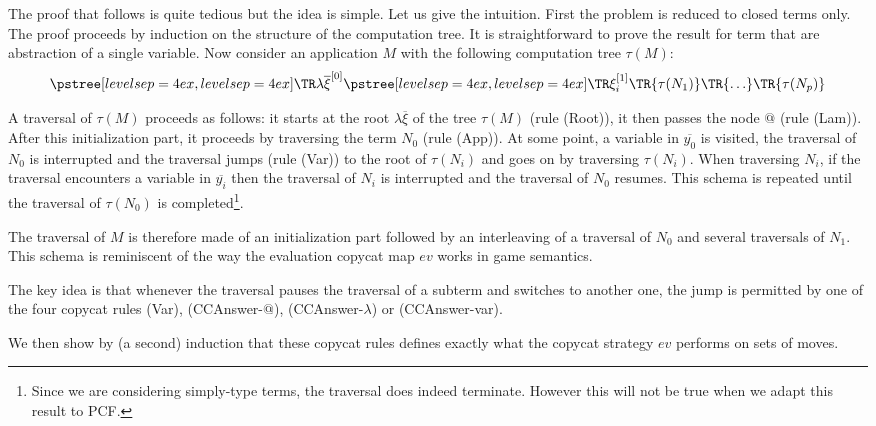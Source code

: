\begin{rem} The proof that follows is quite tedious but the idea is simple. Let us give the intuition.
    First the problem is reduced to closed terms only. The proof proceeds by induction on the structure of the computation tree.
    It is straightforward to prove the result for term that are abstraction of a single variable.
    Now consider an application $M$ with the following computation tree $\tau(M)$:
    $$ \tree[levelsep=4ex]{\lambda \overline{\xi}^{[0]}}
        { \tree[levelsep=4ex]{\xi_i^{[1]}}
            {   \TR{\tau(N_1)} \TR{\ldots} \TR{\tau(N_p)}}}
    $$

    A traversal of $\tau(M)$ proceeds as follows: it starts at the root $\lambda \overline{\xi}$ of the tree $\tau(M)$ (rule
    (Root)), it then passes the node $@$ (rule (Lam)).
    After this initialization part, it proceeds by traversing the term $N_0$ (rule (App)).
    At some point, a variable in $\overline{y_0}$ is visited, the traversal
    of $N_0$ is interrupted and the traversal jumps (rule (Var)) to the root of $\tau(N_i)$ and goes on by traversing $\tau(N_i)$.
    When traversing $N_i$, if the traversal encounters a variable in $\overline{y_i}$ then the traversal of $N_i$ is interrupted and
    the traversal of $N_0$ resumes.  This schema is repeated until the traversal of $\tau(N_0)$ is completed\footnote{Since we are considering
    simply-type terms, the traversal does indeed terminate. However this will not be true when we adapt this result to PCF.}.

    The traversal of $M$ is therefore made of an initialization part followed by an interleaving of a traversal of $N_0$ and
    several traversals of $N_1$. This schema is reminiscent of the way the evaluation copycat map $ev$ works in game semantics.

    The key idea is that whenever the traversal pauses the traversal of a subterm and switches to another one,
    the jump is permitted by one of the four copycat rules (Var), (CCAnswer-$@$), (CCAnswer-$\lambda$) or (CCAnswer-var).

    We then show by (a second) induction that these copycat rules defines exactly what the copycat strategy $ev$ performs on sets of moves.


\end{rem}
